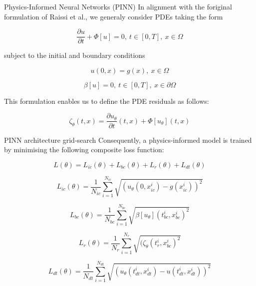 \documentclass[serif,8pt, aspectratio=169]{beamer}
\begin{document}
\begin{frame}[fragile]{Physics-Informed Neural Networks (PINN)}
    In alignment with the foriginal formulation of Raissi et al., we generaly consider PDEs taking the form
    
    \begin{equation}
        \frac{\partial u}{\partial t} + \Phi[u] = 0,~t\in [0,T],~x \in \Omega
    \end{equation}
    
    subject to the initial and boundary conditions
    
    \begin{equation}
        u(0,x)=g(x),~x\in\Omega 
    \end{equation}
    
    \begin{equation}
        \beta [u]=0,~t\in[0,T],~x\in\partial\Omega
    \end{equation}

    This formulation enables us to define the PDE residuals as follows:

    \begin{equation}
        \zeta_\theta (t,x) = \frac{\partial u_\theta}{\partial t}(t,x) + \Phi[u_\theta](t,x)
    \end{equation}

    
\end{frame}

\begin{frame}[fragile]{PINN architecture grid-search}
    Consequently, a physics-informed model is trained by minimising the following composite loss function:
    
    \begin{equation}
       \textit{L}(\theta ) = \textit{L}_{ic}(\theta )+\textit{L}_{bc}(\theta )+\textit{L}_{r}(\theta )+\textit{L}_{dt}(\theta )
    \end{equation}
    
    \begin{equation}
        \textit{L}_{ic}(\theta )=\frac{1}{N_{ic}}\sum^{N_{ic}}_{i=1}\sqrt{(u_\theta(0,x_{ic}^i)-g(x_{ic}^i))^2}
    \end{equation}

    \begin{equation}
        \textit{L}_{bc}(\theta )=\frac{1}{N_{bc}}\sum^{N_{bc}}_{i=1}\sqrt{\beta[u_\theta](t^{i}_{bc},x^i_{bc})^2}
    \end{equation}

    \begin{equation}
        \textit{L}_{r}(\theta )=\frac{1}{N_{r}}\sum^{N_{r}}_{i=1}\sqrt{(\zeta_\theta(t^i_{r},x^i_{bc})^2}
    \end{equation}

    \begin{equation}
        \textit{L}_{dt}(\theta )=\frac{1}{N_{dt}}\sum^{N_{dt}}_{i=1}\sqrt{(u_\theta(t^i_{dt},x_{dt}^i)-u(t^i_{dt},x_{dt}^i))^2}
    \end{equation}

\end{frame}
\end{document}
